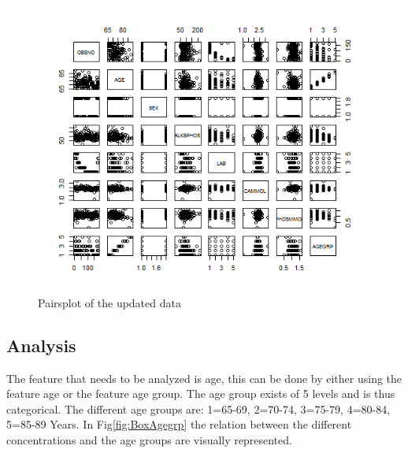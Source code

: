 \documentclass{article}
\begin{document}
      \begin{figure}[H]
          \centering
          \includegraphics[scale=0.5]{../results/SecondPairs.png}
          \caption{Pairsplot of the updated data}
          \label{fig:SecondPairs}
      \end{figure}

    \subsection{Analysis}
      The feature that needs to be analyzed is age, this can be done by either using the feature age or the feature age group.
      The age group exists of 5 levels and is thus categorical.
      The different age groups are: 1=65-69, 2=70-74, 3=75-79, 4=80-84, 5=85-89 Years.
      In Fig\ref{fig:BoxAgegrp} the relation between the different concentrations and the age groups are visually represented.
\end{document}
